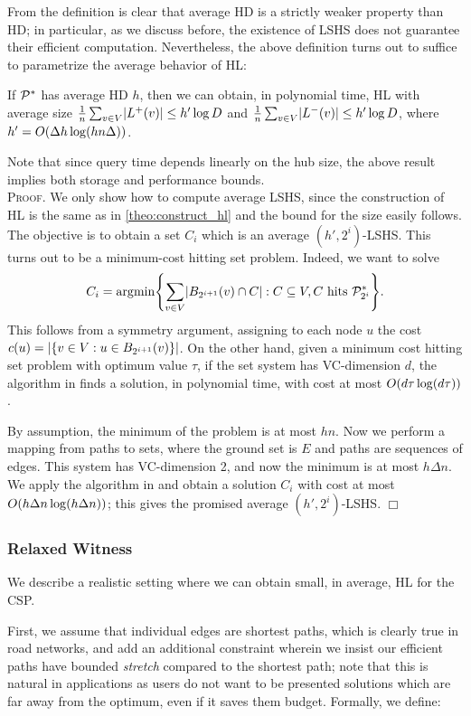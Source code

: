 \documentclass[opre,nonblindrev]{informs3} %
\renewenvironment{proof}[1][\textsc{Proof.}]{#1 }{\hfill $\Box$}
\begin{document}
From the definition is clear that average HD is a strictly weaker property than HD; in particular, as we discuss before, the existence of LSHS does not guarantee their efficient computation.
Nevertheless, the above definition turns out to suffice to parametrize the average behavior of HL:
\begin{theorem}\label{theo:preproc_avg}
If $\mathcal{P}^*$ has average HD $h$, then we can obtain, in polynomial time, HL with average size 
$\frac{1}{n}\sum_{v\in V} \lvert L^+(v)\rvert \leq h'\log D$ and 
$\frac{1}{n}\sum_{v\in V} \lvert L^-(v)\rvert \leq h'\log D$,
where $h'=O(\Delta h\log (hn\Delta))$.
\end{theorem}
Note that since query time depends linearly on the hub size, the above result implies both storage and performance bounds.\\
\begin{proof}
We only show how to compute average LSHS, since the construction of HL is the same as in \cref{theo:construct_hl} and the bound for the size easily follows. 
The objective is to obtain a set $C_i$ which is an average $(h',2^i)$-LSHS.
This turns out to be a minimum-cost hitting set problem.
Indeed, we want to solve
\[
C_i = \arg\!\min\crl*{\sum_{v\in V}\abs{B_{2^{i+1}}(v)\cap C}: C\subseteq V, C \text{ hits } \PS_{2^i}}.
\]
This follows from a symmetry argument, assigning to each node $u$ the cost $c(u)=\lvert\{v\in V: u\in B_{2^{i+1}}(v)\}\rvert$.
On the other hand, given a minimum cost hitting set problem with optimum value $\tau$, if the set system has VC-dimension $d$, the algorithm in \cite{vc_dim_hitting} finds a solution, in polynomial time, with cost at most $O(d\tau\log(d\tau))$.

By assumption, the minimum of the problem is at most $hn$.
Now we perform a mapping from paths to sets, where the ground set is $E$ and paths are sequences of edges.
This system has VC-dimension 2, and now the minimum is at most $h\Delta n$.
We apply the algorithm in \cite{vc_dim_hitting} and obtain a solution $C_i$ with cost at most $O(h\Delta n\log(h\Delta n))$; this gives the promised average $(h',2^i)$-LSHS.
\end{proof}

\subsubsection{Relaxed Witness}
\label{sec:relaxed_witness}
We describe a realistic setting where we can obtain small, in average, HL for the CSP.

First, we assume that individual edges are shortest paths, which is clearly true in road networks, and add an additional constraint wherein we insist our efficient paths have bounded \emph{stretch} compared to the shortest path; note that this is natural in applications as users do not want to be presented solutions which are far away from the optimum, even if it saves them budget.
Formally, we define:
\end{document}
